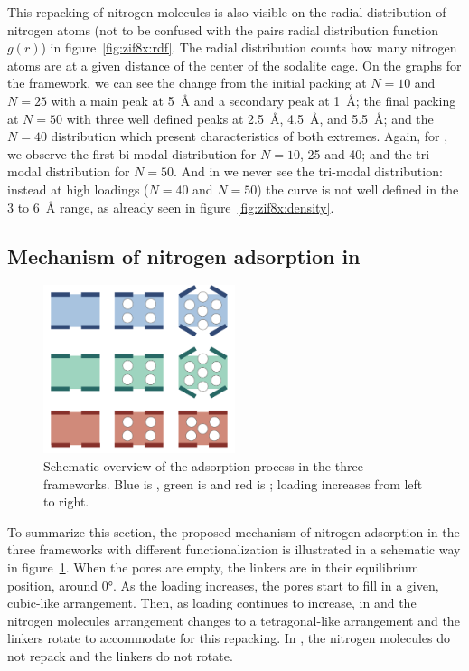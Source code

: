 \documentclass[thesis]{subfiles}
\begin{document}
This repacking of nitrogen molecules is also visible on the radial distribution
of nitrogen atoms (not to be confused with the pairs radial distribution
function $g(r)$) in figure~\ref{fig:zif8x:rdf}. The radial distribution counts
how many nitrogen atoms are at a given distance of the center of the sodalite
cage. On the graphs for the  framework, we can see the change from the
initial packing at $N = 10$ and $N = 25$ with a main peak at \SI{5}{\AA} and a
secondary peak at \SI{1}{\AA}; the final packing at $N = 50$ with three well
defined peaks at \SI{2.5}{\AA}, \SI{4.5}{\AA}, and \SI{5.5}{\AA}; and the $N =
40$ distribution which present characteristics of both extremes. Again, for
\ZIFCl, we observe the first bi-modal distribution for $N = 10$, 25 and 40; and
the tri-modal distribution for $N = 50$. And in \ZIFBr we never see the
tri-modal distribution: instead at high loadings ($N = 40$ and $N = 50$) the
curve is not well defined in the 3 to \SI{6}{\AA} range, as already seen in
figure~\ref{fig:zif8x:density}.

\subsection{Mechanism of nitrogen adsorption in }

\begin{figure}[ht]
    \centering
    \includegraphics[width=0.5\textwidth]{figures/images/zif8x-summary}
    \caption{Schematic overview of the adsorption process in the three 
    frameworks. Blue is , green is \ZIFCl and red is \ZIFBr; loading
    increases from left to right.}
    \label{fig:zif8x:summary}
\end{figure}

To summarize this section, the proposed mechanism of nitrogen adsorption in the
three  frameworks with different functionalization is illustrated in a
schematic way in figure~\ref{fig:zif8x:summary}. When the pores are empty, the
linkers are in their equilibrium position, around 0°. As the loading increases,
the pores start to fill in a given, cubic-like arrangement. Then, as loading
continues to increase, in  and \ZIFCl the nitrogen molecules arrangement
changes to a tetragonal-like arrangement and the linkers rotate to accommodate
for this repacking. In \ZIFBr, the nitrogen molecules do not repack and the
linkers do not rotate.
\end{document}
